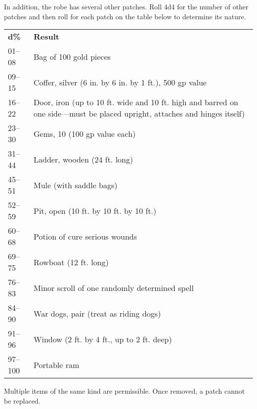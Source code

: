 In addition, the robe has several other patches. Roll 4d4 for the number of other patches and then roll for each patch on the table below to determine its nature.
\setlength{\tabcolsep}{1pt}
\begin{tabularx}{\linewidth}{lX}
\textbf{d\%} & \textbf{Result}                                                                                                          \\
01--08        & Bag of 100 gold pieces                                                                                                   \\
09--15        & Coffer, silver (6 in. by 6 in. by 1 ft.), 500 gp value                                                                   \\
16--22        & Door, iron (up to 10 ft. wide and 10 ft. high and barred on one side---must be placed upright, attaches and hinges itself) \\
23--30        & Gems, 10 (100 gp value each)                                                                                             \\
31--44        & Ladder, wooden (24 ft. long)                                                                                             \\
45--51        & Mule (with saddle bags)                                                                                                  \\
52--59        & Pit, open (10 ft. by 10 ft. by 10 ft.)                                                                                   \\
60--68        & Potion of cure serious wounds                                                                                            \\
69--75        & Rowboat (12 ft. long)                                                                                                    \\
76--83        & Minor scroll of one randomly determined spell                                                                            \\
84--90        & War dogs, pair (treat as riding dogs)                                                                                    \\
91--96        & Window (2 ft. by 4 ft., up to 2 ft. deep)                                                                                \\
97--100       & Portable ram                                                                                                            
\end{tabularx}
Multiple items of the same kind are permissible. Once removed, a patch cannot be replaced. 
				
